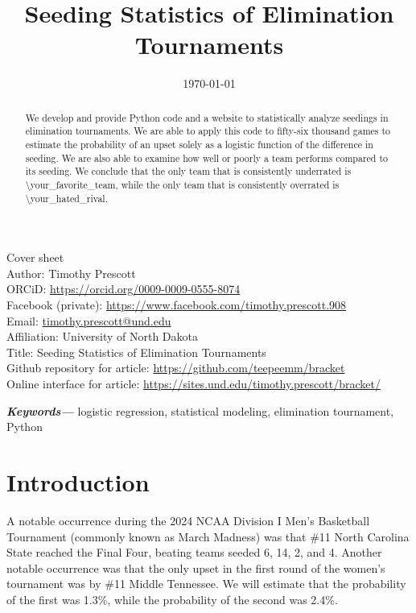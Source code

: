 \documentclass{article}
\title{Seeding Statistics of Elimination Tournaments}
\author{\authorinfo}
\date{\today}
\begin{document}
\noindent
Cover sheet\\
Author: Timothy Prescott\\
ORCiD: \url{https://orcid.org/0009-0009-0555-8074}\\
Facebook (private): \url{https://www.facebook.com/timothy.prescott.908}\\
Email: \url{timothy.prescott@und.edu}\\
Affiliation: University of North Dakota\\
Title: Seeding Statistics of Elimination Tournaments\\
Github repository for article: \url{https://github.com/teepeemm/bracket}\\
Online interface for article: \url{https://sites.und.edu/timothy.prescott/bracket/}

\clearpage

\maketitle

\tableofcontents

\begin{abstract}\noindent
We develop and provide Python code and a website to statistically analyze seedings in elimination tournaments.  We are able to apply this code to fifty-six thousand games to estimate the probability of an upset solely as a logistic function of the difference in seeding.  We are also able to examine how well or poorly a team performs compared to its seeding.  We conclude that the only team that is consistently underrated is \textbackslash your\_favorite\_team, while the only team that is consistently overrated is \textbackslash your\_hated\_rival.
\end{abstract}

\noindent
{\small\textbf{\textit{Keywords---}} logistic regression, statistical modeling, elimination tournament, Python}

\section{Introduction}
A notable occurrence during the 2024 NCAA Division I Men's Basketball Tournament (commonly known as March Madness) was that \#11 North Carolina State reached the Final Four, beating teams seeded 6, 14, 2, and 4.  Another notable occurrence was that the only upset in the first round of the women's tournament was by \#11 Middle Tennessee.  We will estimate that the probability of the first was 1.3\%, while the probability of the second was 2.4\%.
\end{document}
